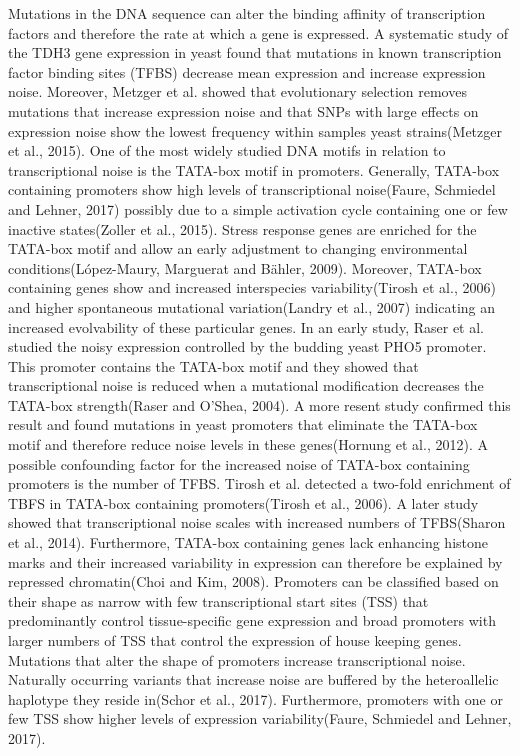 Mutations in the DNA sequence can alter the binding affinity of transcription factors and therefore the rate at which a gene is expressed. A systematic study of the TDH3 gene expression in yeast found that mutations in known transcription factor binding sites (TFBS) decrease mean expression and increase expression noise. Moreover, Metzger et al. showed that evolutionary selection removes mutations that increase expression noise and that SNPs with large effects on expression noise show the lowest frequency within samples yeast strains(Metzger et al., 2015).
One of the most widely studied DNA motifs in relation to transcriptional noise is the TATA-box motif in promoters. Generally, TATA-box containing promoters show high levels of transcriptional noise(Faure, Schmiedel and Lehner, 2017) possibly due to a simple activation cycle containing one or few inactive states(Zoller et al., 2015). Stress response genes are enriched for the TATA-box motif and allow an early adjustment to changing environmental conditions(López-Maury, Marguerat and Bähler, 2009). Moreover, TATA-box containing genes show and increased interspecies variability(Tirosh et al., 2006) and higher spontaneous mutational variation(Landry et al., 2007) indicating an increased evolvability of these particular genes. In an early study, Raser et al. studied the noisy expression controlled by the budding yeast PHO5 promoter. This promoter contains the TATA-box motif and they showed that transcriptional noise is reduced when a mutational modification decreases the TATA-box strength(Raser and O’Shea, 2004). A more resent study confirmed this result and found mutations in yeast promoters that eliminate the TATA-box motif and therefore reduce noise levels in these genes(Hornung et al., 2012).
A possible confounding factor for the increased noise of TATA-box containing promoters is the number of TFBS. Tirosh et al. detected a two-fold enrichment of TBFS in TATA-box containing promoters(Tirosh et al., 2006). A later study showed that transcriptional noise scales with increased numbers of TFBS(Sharon et al., 2014). Furthermore, TATA-box containing genes lack enhancing histone marks and their increased variability in expression can therefore be explained by repressed chromatin(Choi and Kim, 2008).  
Promoters can be classified based on their shape as narrow with few transcriptional start sites (TSS) that predominantly control tissue-specific gene expression and broad promoters with larger numbers of TSS that control the expression of house keeping genes. Mutations that alter the shape of promoters increase transcriptional noise. Naturally occurring variants that increase noise are buffered by the heteroallelic haplotype they reside in(Schor et al., 2017). Furthermore, promoters with one or few TSS show higher levels of expression variability(Faure, Schmiedel and Lehner, 2017).
